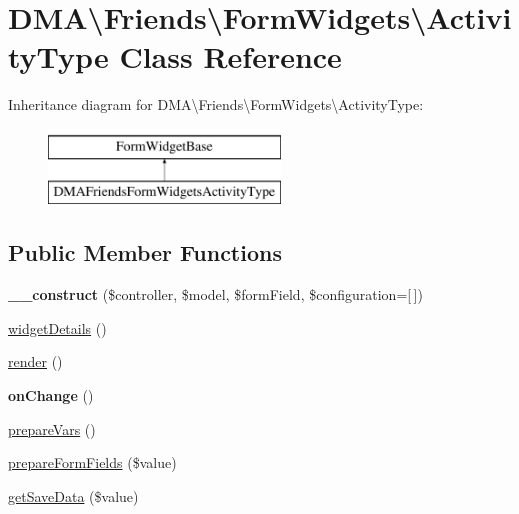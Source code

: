 \hypertarget{classDMA_1_1Friends_1_1FormWidgets_1_1ActivityType}{}\section{D\+M\+A\textbackslash{}Friends\textbackslash{}Form\+Widgets\textbackslash{}Activity\+Type Class Reference}
\label{classDMA_1_1Friends_1_1FormWidgets_1_1ActivityType}
Inheritance diagram for D\+M\+A\textbackslash{}Friends\textbackslash{}Form\+Widgets\textbackslash{}Activity\+Type\+:\begin{figure}[H]
\begin{center}
\leavevmode
\includegraphics[height=2.000000cm]{dd/d00/classDMA_1_1Friends_1_1FormWidgets_1_1ActivityType}
\end{center}
\end{figure}
\subsection*{Public Member Functions}
\begin{DoxyCompactItemize}
\item 
\hypertarget{classDMA_1_1Friends_1_1FormWidgets_1_1ActivityType_a41eb54cbededeb19012194bd656c6a2a}{}{\bfseries \+\_\+\+\_\+construct} (\$controller, \$model, \$form\+Field, \$configuration=\mbox{[}$\,$\mbox{]})\label{classDMA_1_1Friends_1_1FormWidgets_1_1ActivityType_a41eb54cbededeb19012194bd656c6a2a}

\item 
\hyperlink{classDMA_1_1Friends_1_1FormWidgets_1_1ActivityType_a30e532c2b0ba9f84a828d3dd3df547c5}{widget\+Details} ()
\item 
\hyperlink{classDMA_1_1Friends_1_1FormWidgets_1_1ActivityType_a6d71571b9e99eb856f81a472f09f2279}{render} ()
\item 
\hypertarget{classDMA_1_1Friends_1_1FormWidgets_1_1ActivityType_ab5e40feb965c8d47095132ddc426f77e}{}{\bfseries on\+Change} ()\label{classDMA_1_1Friends_1_1FormWidgets_1_1ActivityType_ab5e40feb965c8d47095132ddc426f77e}

\item 
\hyperlink{classDMA_1_1Friends_1_1FormWidgets_1_1ActivityType_abb8585f86e795e2f9bfd6bea78a2f7ab}{prepare\+Vars} ()
\item 
\hyperlink{classDMA_1_1Friends_1_1FormWidgets_1_1ActivityType_ab8b5e6c785f85176a4884d3218b1b064}{prepare\+Form\+Fields} (\$value)
\item 
\hyperlink{classDMA_1_1Friends_1_1FormWidgets_1_1ActivityType_a2cfdaad84b2f972cb3df04badf77b251}{get\+Save\+Data} (\$value)
\end{DoxyCompactItemize}
